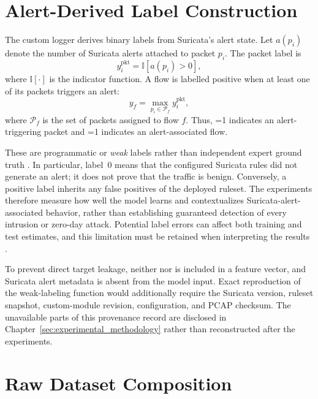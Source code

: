 \documentclass[11pt,fleqn]{report}
\begin{document}
\section{Alert-Derived Label Construction}
\label{subsec:label_construction}

The custom logger derives binary labels from Suricata's alert state. Let
$a(p_i)$ denote the number of Suricata alerts attached to packet $p_i$. The
packet label is
\begin{equation}
    y_i^{\mathrm{pkt}}
    = \mathbb{I}\!\left[a(p_i)>0\right],
    \label{eq:packet_alert_label}
\end{equation}
where $\mathbb{I}[\cdot]$ is the indicator function. A flow is labelled
positive when at least one of its packets triggers an alert:
\begin{equation}
    y_f
    = \max_{p_i\in\mathcal{P}_f} y_i^{\mathrm{pkt}},
    \label{eq:flow_alert_label}
\end{equation}
where $\mathcal{P}_f$ is the set of packets assigned to flow $f$. Thus,
=1 indicates an alert-triggering packet and
=1 indicates an alert-associated flow.

These are programmatic or \emph{weak} labels rather than independent expert
ground truth \cite{Ratner2017Snorkel}. In particular, label~0 means that the
configured Suricata rules did not generate an alert; it does not prove that the
traffic is benign. Conversely, a positive label inherits any false positives
of the deployed ruleset. The experiments therefore measure how well the model
learns and contextualizes Suricata-alert-associated behavior, rather than
establishing guaranteed detection of every intrusion or zero-day attack.
Potential label errors can affect both training and test estimates, and this
limitation must be retained when interpreting the results
\cite{Northcutt2021ConfidentLearning}.

To prevent direct target leakage, neither  nor
 is included in a feature vector, and Suricata alert
metadata is absent from the model input. Exact reproduction of the weak-labeling
function would additionally require the Suricata version, ruleset snapshot,
custom-module revision, configuration, and PCAP checksum. The unavailable parts
of this provenance record are disclosed in
Chapter~\ref{sec:experimental_methodology} rather than reconstructed after the
experiments.

\section{Raw Dataset Composition}
\label{subsec:raw_composition}
\end{document}
